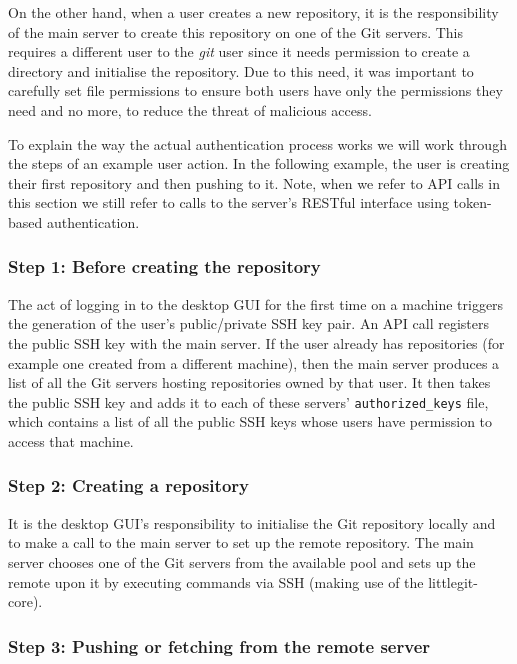 On the other hand, when a user creates a new repository, it is the responsibility of the main server to create this repository on one of the Git servers. This requires a different user to the \emph{git} user since it needs permission to create a directory and initialise the repository. Due to this need, it was important to carefully set file permissions to ensure both users have only the permissions they need and no more, to reduce the threat of malicious access.

To explain the way the actual authentication process works we will work through the steps of an example user action. In the following example, the user is creating their first repository and then pushing to it. Note, when we refer to API calls in this section we still refer to calls to the server's RESTful interface using token-based authentication.

\subsubsection{Step 1: Before creating the repository}

The act of logging in to the desktop GUI for the first time on a machine triggers the generation of the user's public/private SSH key pair. An API call registers the public SSH key with the main server. If the user already has repositories (for example one created from a different machine), then the main server produces a list of all the Git servers hosting repositories owned by that user. It then takes the public SSH key and adds it to each of these servers'  \texttt{authorized\_keys} file, which contains a list of all the public SSH keys whose users have permission to access that machine.

\subsubsection{Step 2: Creating a repository}
 
It is the desktop GUI's responsibility to initialise the Git repository locally and to make a call to the main server to set up the remote repository. The main server chooses one of the Git servers from the available pool and sets up the remote upon it by executing commands via SSH (making use of the littlegit-core).

\subsubsection{Step 3: Pushing or fetching from the remote server}

